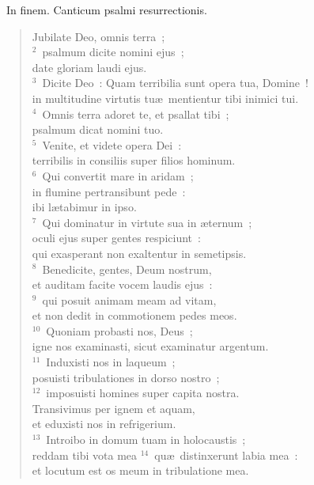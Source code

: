 ~\lettrine[lines=10,image=true,loversize=0.05,lraise=-0.03]{I}{}n finem. Canticum psalmi resurrectionis. \begin{flushleft}\begin{verse}\vspace{6pt}Jubilate Deo, omnis terra~;\\
${}^{2}$~psalmum dicite nomini ejus~;\\ date gloriam laudi ejus.\\
${}^{3}$~Dicite Deo~: Quam terribilia sunt opera tua, Domine~!\\ in multitudine virtutis tu\ae\ mentientur tibi inimici tui.\\
${}^{4}$~Omnis terra adoret te, et psallat tibi~;\\ psalmum dicat nomini tuo.\\
${}^{5}$~Venite, et videte opera Dei~:\\ terribilis in consiliis super filios hominum.\\
${}^{6}$~Qui convertit mare in aridam~;\\ in flumine pertransibunt pede~:\\ ibi l\ae tabimur in ipso.\\
${}^{7}$~Qui dominatur in virtute sua in \ae ternum~;\\ oculi ejus super gentes respiciunt~:\\ qui exasperant non exaltentur in semetipsis.\\
${}^{8}$~Benedicite, gentes, Deum nostrum,\\ et auditam facite vocem laudis ejus~:\\
${}^{9}$~qui posuit animam meam ad vitam,\\ et non dedit in commotionem pedes meos.\\
${}^{10}$~Quoniam probasti nos, Deus~;\\ igne nos examinasti, sicut examinatur argentum.\\
${}^{11}$~Induxisti nos in laqueum~;\\ posuisti tribulationes in dorso nostro~;\\
${}^{12}$~imposuisti homines super capita nostra.\\ Transivimus per ignem et aquam,\\ et eduxisti nos in refrigerium.\\
${}^{13}$~Introibo in domum tuam in holocaustis~;\\ reddam tibi vota mea
${}^{14}$~qu\ae\ distinxerunt labia mea~:\\ et locutum est os meum in tribulatione mea.\\

\end{verse}
\end{flushleft}
